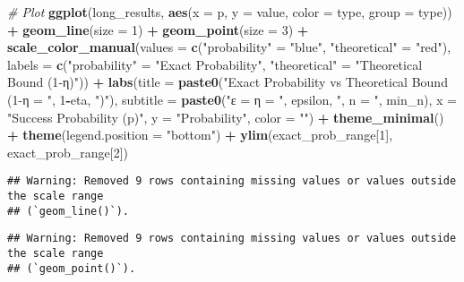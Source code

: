 \documentclass[
]{article}
\newenvironment{Shaded}{\begin{snugshade}}{\end{snugshade}}
\newcommand{\AttributeTok}[1]{\textcolor[rgb]{0.13,0.29,0.53}{#1}}
\newcommand{\CommentTok}[1]{\textcolor[rgb]{0.56,0.35,0.01}{\textit{#1}}}
\newcommand{\DecValTok}[1]{\textcolor[rgb]{0.00,0.00,0.81}{#1}}
\newcommand{\FunctionTok}[1]{\textcolor[rgb]{0.13,0.29,0.53}{\textbf{#1}}}
\newcommand{\NormalTok}[1]{#1}
\newcommand{\OtherTok}[1]{\textcolor[rgb]{0.56,0.35,0.01}{#1}}
\newcommand{\SpecialCharTok}[1]{\textcolor[rgb]{0.81,0.36,0.00}{\textbf{#1}}}
\newcommand{\StringTok}[1]{\textcolor[rgb]{0.31,0.60,0.02}{#1}}
\begin{document}
\begin{Shaded}
\begin{Highlighting}[]
\CommentTok{\# Plot}
\FunctionTok{ggplot}\NormalTok{(long\_results, }\FunctionTok{aes}\NormalTok{(}\AttributeTok{x =}\NormalTok{ p, }\AttributeTok{y =}\NormalTok{ value, }\AttributeTok{color =}\NormalTok{ type, }\AttributeTok{group =}\NormalTok{ type)) }\SpecialCharTok{+}
  \FunctionTok{geom\_line}\NormalTok{(}\AttributeTok{size =} \DecValTok{1}\NormalTok{) }\SpecialCharTok{+}
  \FunctionTok{geom\_point}\NormalTok{(}\AttributeTok{size =} \DecValTok{3}\NormalTok{) }\SpecialCharTok{+}
  \FunctionTok{scale\_color\_manual}\NormalTok{(}\AttributeTok{values =} \FunctionTok{c}\NormalTok{(}\StringTok{"probability"} \OtherTok{=} \StringTok{"blue"}\NormalTok{, }\StringTok{"theoretical"} \OtherTok{=} \StringTok{"red"}\NormalTok{),}
                    \AttributeTok{labels =} \FunctionTok{c}\NormalTok{(}\StringTok{"probability"} \OtherTok{=} \StringTok{"Exact Probability"}\NormalTok{, }
                              \StringTok{"theoretical"} \OtherTok{=} \StringTok{"Theoretical Bound (1{-}η)"}\NormalTok{)) }\SpecialCharTok{+}
  \FunctionTok{labs}\NormalTok{(}\AttributeTok{title =} \FunctionTok{paste0}\NormalTok{(}\StringTok{"Exact Probability vs Theoretical Bound (1{-}η = "}\NormalTok{, }\DecValTok{1}\SpecialCharTok{{-}}\NormalTok{eta, }\StringTok{")"}\NormalTok{),}
       \AttributeTok{subtitle =} \FunctionTok{paste0}\NormalTok{(}\StringTok{"ε = η = "}\NormalTok{, epsilon, }\StringTok{", n = "}\NormalTok{, min\_n),}
       \AttributeTok{x =} \StringTok{"Success Probability (p)"}\NormalTok{,}
       \AttributeTok{y =} \StringTok{"Probability"}\NormalTok{,}
       \AttributeTok{color =} \StringTok{""}\NormalTok{) }\SpecialCharTok{+}
  \FunctionTok{theme\_minimal}\NormalTok{() }\SpecialCharTok{+}
  \FunctionTok{theme}\NormalTok{(}\AttributeTok{legend.position =} \StringTok{"bottom"}\NormalTok{) }\SpecialCharTok{+}
  \FunctionTok{ylim}\NormalTok{(exact\_prob\_range[}\DecValTok{1}\NormalTok{], exact\_prob\_range[}\DecValTok{2}\NormalTok{])}
\end{Highlighting}
\end{Shaded}

\begin{verbatim}
## Warning: Removed 9 rows containing missing values or values outside the scale range
## (`geom_line()`).
\end{verbatim}

\begin{verbatim}
## Warning: Removed 9 rows containing missing values or values outside the scale range
## (`geom_point()`).
\end{verbatim}
\end{document}
